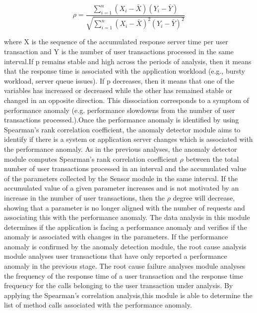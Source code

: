 \begin{compactitem}


\begin{equation}
\rho=\frac { \sum_{ i=1} ^n(X_i-\bar{ X})(Y_i-\bar{ Y})}{\sqrt{\sum_{ i=1} ^n (X_i-\bar{ X})^2 (Y_i-\bar{ Y})^2}}
\end{equation}


where X is the sequence of the accumulated response server time per user transaction and Y is the number of user transactions processed in the same interval.If p remains stable and high across the periods of analysis, then it means that the response time is associated with the application workload (e.g., bursty workload, server queue issues). If p  decreases, then it means that one of the variables has increased or decreased while the other has remained stable or changed in an opposite direction. This dissociation corresponds to a symptom of performance anomaly (e.g. performance slowdowns from the number of user transactions processed.).Once the performance anomaly is identified by using  Spearman's rank correlation coefficient, the anomaly detector module aims to identify if there is a system or application server changes which is associated with the performance anomaly. As in the previous analyses, the anomaly detector module computes Spearman’s rank correlation coefficient $\rho$ between  the total number of user transactions processed in an interval and the accumulated value of the parameters collected by the Sensor module in the same interval. If the accumulated value of a given parameter increases and is not motivated by an increase in the number of user transactions, then the $\rho$ degree will decrease, showing that a parameter is no longer aligned with the number of requests and associating this with the performance anomaly. The data analysis in this module determines if the application is facing a performance anomaly and verifies if the anomaly is associated with changes in the parameters. If the performance anomaly is confirmed by the anomaly detection module, the root cause analysis module analyses user transactions that have only reported a performance anomaly in the previous stage. 
The root cause failure analyses module analyses the frequency of the response time of a user transaction and the response time frequency for the calls belonging to the user transaction under analysis. By applying the Spearman’s correlation analysis,this module is able to determine the list of method calls associated with the performance anomaly.


\end{compactitem}
